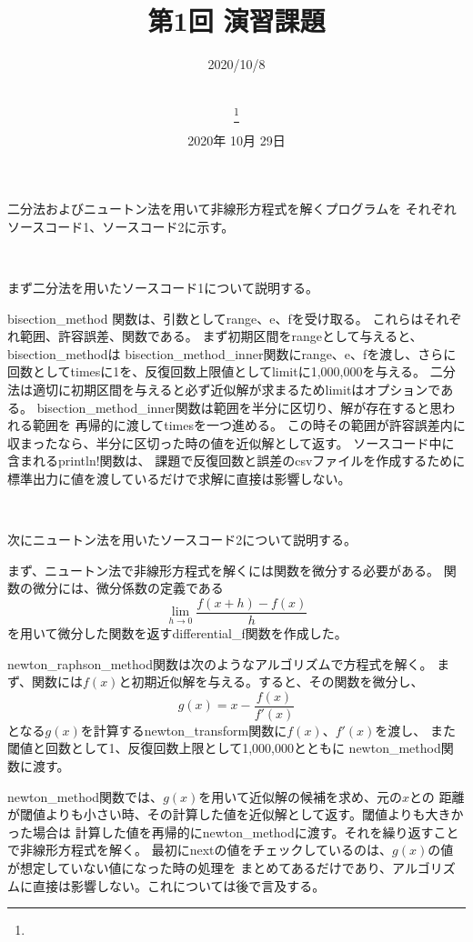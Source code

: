 \documentclass[uplatex, dvipdfmx, 11pt,a4j, titlepage]{jsarticle}
\title{第1回 演習課題}
\date{2020年 10月 29日}
\author{
    \small{\myid} \\
    \myname\thanks{\mymail}
}
\begin{document}
\maketitle


\subtitle{2020/10/8}


二分法およびニュートン法を用いて非線形方程式を解くプログラムを
それぞれソースコード1、ソースコード2に示す。

\ 

まず二分法を用いたソースコード1について説明する。

bisection\_method 関数は、引数としてrange、e、fを受け取る。
これらはそれぞれ範囲、許容誤差、関数である。
まず初期区間をrangeとして与えると、bisection\_methodは
bisection\_method\_inner関数にrange、e、fを渡し、さらに
回数としてtimesに1を、反復回数上限値としてlimitに1,000,000を与える。
二分法は適切に初期区間を与えると必ず近似解が求まるためlimitはオプションである。
bisection\_method\_inner関数は範囲を半分に区切り、解が存在すると思われる範囲を
再帰的に渡してtimesを一つ進める。
この時その範囲が許容誤差内に収まったなら、半分に区切った時の値を近似解として返す。
ソースコード中に含まれるprintln!関数は、
課題で反復回数と誤差のcsvファイルを作成するために
標準出力に値を渡しているだけで求解に直接は影響しない。

\ 

次にニュートン法を用いたソースコード2について説明する。

まず、ニュートン法で非線形方程式を解くには関数を微分する必要がある。
関数の微分には、微分係数の定義である
\begin{equation}
    \lim_{h \to 0} \frac{f(x + h) - f(x)}{h}   
\end{equation}
を用いて微分した関数を返すdifferential\_f関数を作成した。

newton\_raphson\_method関数は次のようなアルゴリズムで方程式を解く。
まず、関数には$f(x)$と初期近似解を与える。すると、その関数を微分し、
\begin{equation}
    g(x) = x - \frac{f(x)}{f'(x)}
\end{equation}
となる$g(x)$を計算するnewton\_transform関数に$f(x)$、$f'(x)$を渡し、
また閾値と回数として1、反復回数上限として1,000,000とともに
newton\_method関数に渡す。

newton\_method関数では、$g(x)$を用いて近似解の候補を求め、元の$x$との
距離が閾値よりも小さい時、その計算した値を近似解として返す。閾値よりも大きかった場合は
計算した値を再帰的にnewton\_methodに渡す。それを繰り返すことで非線形方程式を解く。
最初にnextの値をチェックしているのは、$g(x)$の値が想定していない値になった時の処理を
まとめてあるだけであり、アルゴリズムに直接は影響しない。これについては後で言及する。
\end{document}
